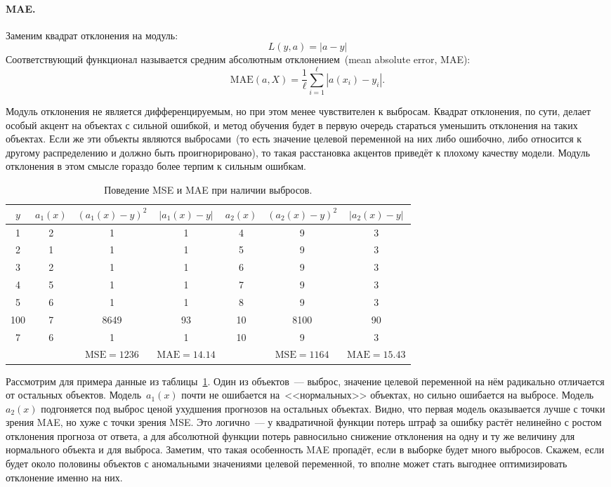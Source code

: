\documentclass[12pt,fleqn]{article}
\begin{document}
\paragraph{MAE.}

Заменим квадрат отклонения на модуль:
\[
    L(y, a) = |a - y|
\]
Соответствующий функционал называется средним абсолютным отклонением~(mean absolute error, MAE):
\[
    \text{MAE}(a, X)
    =
    \frac{1}{\ell}
    \sum_{i = 1}^{\ell} \left|
        a(x_i) - y_i
    \right|.
\]

Модуль отклонения не является дифференцируемым, но при этом менее чувствителен к выбросам.
Квадрат отклонения, по сути, делает особый акцент на объектах с сильной ошибкой,
и метод обучения будет в первую очередь стараться уменьшить отклонения на таких объектах.
Если же эти объекты являются выбросами~(то есть значение целевой переменной на них либо ошибочно,
либо относится к другому распределению и должно быть проигнорировано),
то такая расстановка акцентов приведёт к плохому качеству модели.
Модуль отклонения в этом смысле гораздо более терпим к сильным ошибкам.

\begin{table}[t]
\centering
\begin{tabular}[t]{|c||c|c|c||c|c|c|}
    \hline
    $y$ & $a_1(x)$ & $(a_1(x) - y)^2$ & $|a_1(x) - y|$ & $a_2(x)$ & $(a_2(x) - y)^2$ & $|a_2(x) - y|$  \\
    \hline
    1 & 2 & 1 & 1 & 4 & 9 & 3 \\
    2 & 1 & 1 & 1 & 5 & 9 & 3 \\
    3 & 2 & 1 & 1 & 6 & 9 & 3 \\
    4 & 5 & 1 & 1 & 7 & 9 & 3 \\
    5 & 6 & 1 & 1 & 8 & 9 & 3 \\
    {\color{red} 100} & 7 & 8649 & 93 & 10 & 8100 & 90 \\
    7 & 6 & 1 & 1 & 10 & 9 & 3 \\ \hline
      &   & $\text{MSE} = 1236$ & $\text{MAE} = 14.14$ & & $\text{MSE} = 1164$ & $\text{MAE} = 15.43$ \\
    \hline
\end{tabular}
\caption{Поведение MSE и MAE при наличии выбросов.}
\label{tab:outlier}
\end{table}

Рассмотрим для примера данные из таблицы~\ref{tab:outlier}.
Один из объектов~--- выброс, значение целевой переменной на нём радикально отличается
от остальных объектов.
Модель~$a_1(x)$ почти не ошибается на~<<нормальных>> объектах,
но сильно ошибается на выбросе.
Модель~$a_2(x)$ подгоняется под выброс ценой ухудшения прогнозов на остальных объектах.
Видно, что первая модель оказывается лучше с точки зрения MAE, но хуже с точки зрения MSE.
Это логично~--- у квадратичной функции потерь штраф за ошибку растёт нелинейно с ростом отклонения прогноза от ответа,
а для абсолютной функции потерь равносильно снижение отклонения на одну и ту же величину для нормального объекта и для выброса.
Заметим, что такая особенность MAE пропадёт, если в выборке будет много выбросов.
Скажем, если будет около половины объектов с аномальными значениями целевой переменной, то вполне
может стать выгоднее оптимизировать отклонение именно на них.
\end{document}
